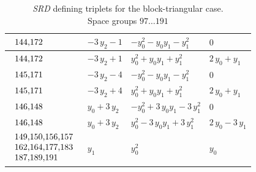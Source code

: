 \begin{table}[H]
\begin{center}
{\begin{tabular}{|l|l|l|l|}
$\begin{tabular}{l}
144,172 \\
\end{tabular}$ & $ -3 \, y_{2} - 1 $ & $ -y_{0}^{2} - y_{0} y_{1} - y_{1}^{2} $ & $ 0 $ \\ \hline
$\begin{tabular}{l}
144,172 \\
\end{tabular}$ & $ -3 \, y_{2} + 1 $ & $ y_{0}^{2} + y_{0} y_{1} + y_{1}^{2} $ & $ 2 \, y_{0} + y_{1} $ \\ \hline
$\begin{tabular}{l}
145,171 \\
\end{tabular}$ & $ -3 \, y_{2} - 4 $ & $ -y_{0}^{2} - y_{0} y_{1} - y_{1}^{2} $ & $ 0 $ \\ \hline
$\begin{tabular}{l}
145,171 \\
\end{tabular}$ & $ -3 \, y_{2} + 4 $ & $ y_{0}^{2} + y_{0} y_{1} + y_{1}^{2} $ & $ 2 \, y_{0} + y_{1} $ \\ \hline
$\begin{tabular}{l}
146,148 \\
\end{tabular}$ & $ y_{0} + 3 \, y_{2} $ & $ -y_{0}^{2} + 3 \, y_{0} y_{1} - 3 \, y_{1}^{2} $ & $ 0 $ \\ \hline
$\begin{tabular}{l}
146,148 \\
\end{tabular}$ & $ y_{0} + 3 \, y_{2} $ & $ y_{0}^{2} - 3 \, y_{0} y_{1} + 3 \, y_{1}^{2} $ & $ 2 \, y_{0} - 3 \, y_{1} $ \\ \hline
$\begin{tabular}{l}
149,150,156,157 \\
162,164,177,183 \\
187,189,191 \\
\end{tabular}$ & $ y_{1} $ & $ y_{0}^{2} $ & $ y_{0} $ \\ \hline
\end{tabular}
}
\captionsetup{justification=centering}
\caption{\textit{SRD} defining triplets for the block-triangular case. \\ Space groups $97\dots191 $}
\label{tab:case1_srdegrees150}
\end{center}
\end{table}

